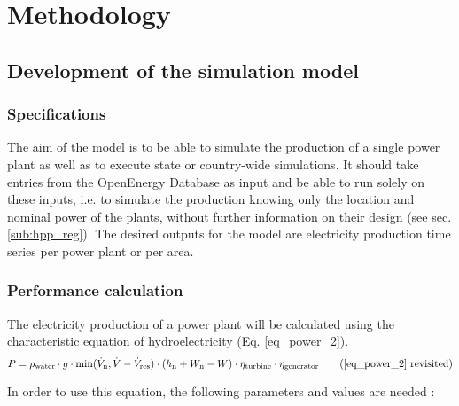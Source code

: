 \chapter{Methodology}
\label{chap:methodology}

\section{Development of the simulation model}

\subsection{Specifications}
\label{sub:spec}

The aim of the model is to be able to simulate the production of a single power plant as well as to execute state or country-wide simulations. It should take entries from the OpenEnergy Database as input and be able to run solely on these inputs, i.e. to simulate the production knowing only the location and nominal power of the plants, without further information on their design (see sec. \ref{sub:hpp_reg}). 
The desired outputs for the model are electricity production time series per power plant or per area.


\subsection{Performance calculation}
\label{sub:perf_calc}

The electricity production of a power plant will be calculated using the characteristic equation of hydroelectricity (Eq. \eqref{eq_power_2}).
\begin{equation*}
 P = \rho_\mathrm{water} \cdot g \cdot \min(\dot{V}_\mathrm{n},\dot{V}-\dot{V}_\mathrm{res}) \cdot (h_\mathrm{n} +W_\mathrm{n}-W) \cdot \eta_\mathrm{turbine} \cdot \eta_\mathrm{generator}\tag{\ref{eq_power_2} revisited}
\end{equation*}

In order to use this equation, the following parameters and values are needed : 

